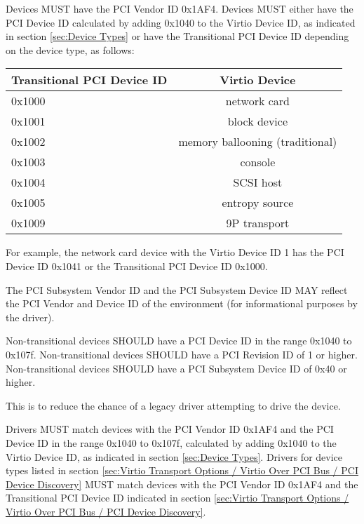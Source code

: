Devices MUST have the PCI Vendor ID 0x1AF4.
Devices MUST either have the PCI Device ID calculated by adding 0x1040
to the Virtio Device ID, as indicated in section \ref{sec:Device
Types} or have the Transitional PCI Device ID depending on the device type,
as follows:

\begin{tabular}{|l|c|}
\hline
Transitional PCI Device ID  &  Virtio Device    \\
\hline \hline
0x1000      &   network card     \\
\hline
0x1001     &   block device     \\
\hline
0x1002     & memory ballooning (traditional)  \\
\hline
0x1003     &      console       \\
\hline
0x1004     &     SCSI host      \\
\hline
0x1005     &  entropy source    \\
\hline
0x1009     &   9P transport     \\
\hline
\end{tabular}

For example, the network card device with the Virtio Device ID 1
has the PCI Device ID 0x1041 or the Transitional PCI Device ID 0x1000.

The PCI Subsystem Vendor ID and the PCI Subsystem Device ID MAY reflect
the PCI Vendor and Device ID of the environment (for informational purposes by the driver).

Non-transitional devices SHOULD have a PCI Device ID in the range
0x1040 to 0x107f.
Non-transitional devices SHOULD have a PCI Revision ID of 1 or higher.
Non-transitional devices SHOULD have a PCI Subsystem Device ID of 0x40 or higher.

This is to reduce the chance of a legacy driver attempting
to drive the device.

Drivers MUST match devices with the PCI Vendor ID 0x1AF4 and
the PCI Device ID in the range 0x1040 to 0x107f,
calculated by adding 0x1040 to the Virtio Device ID,
as indicated in section \ref{sec:Device Types}.
Drivers for device types listed in section \ref{sec:Virtio
Transport Options / Virtio Over PCI Bus / PCI Device Discovery}
MUST match devices with the PCI Vendor ID 0x1AF4 and
the Transitional PCI Device ID indicated in section
 \ref{sec:Virtio
Transport Options / Virtio Over PCI Bus / PCI Device Discovery}.

